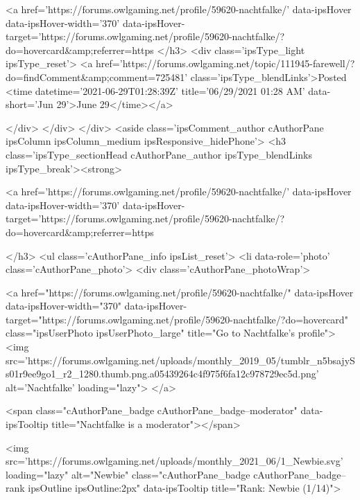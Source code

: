 <a href='https://forums.owlgaming.net/profile/59620-nachtfalke/' data-ipsHover data-ipsHover-width='370' data-ipsHover-target='https://forums.owlgaming.net/profile/59620-nachtfalke/?do=hovercard&amp;referrer=https%
			</h3>
			<div class='ipsType_light ipsType_reset'>
				<a href='https://forums.owlgaming.net/topic/111945-farewell/?do=findComment&amp;comment=725481' class='ipsType_blendLinks'>Posted <time datetime='2021-06-29T01:28:39Z' title='06/29/2021 01:28  AM' data-short='Jun 29'>June 29</time></a>
				
			</div>
		</div>
	</div>
	<aside class='ipsComment_author cAuthorPane ipsColumn ipsColumn_medium ipsResponsive_hidePhone'>
		<h3 class='ipsType_sectionHead cAuthorPane_author ipsType_blendLinks ipsType_break'><strong>


<a href='https://forums.owlgaming.net/profile/59620-nachtfalke/' data-ipsHover data-ipsHover-width='370' data-ipsHover-target='https://forums.owlgaming.net/profile/59620-nachtfalke/?do=hovercard&amp;referrer=https%
			
		</h3>
		<ul class='cAuthorPane_info ipsList_reset'>
			<li data-role='photo' class='cAuthorPane_photo'>
				<div class='cAuthorPane_photoWrap'>
					


	<a href="https://forums.owlgaming.net/profile/59620-nachtfalke/" data-ipsHover data-ipsHover-width="370" data-ipsHover-target="https://forums.owlgaming.net/profile/59620-nachtfalke/?do=hovercard" class="ipsUserPhoto ipsUserPhoto_large" title="Go to Nachtfalke's profile">
		<img src='https://forums.owlgaming.net/uploads/monthly_2019_05/tumblr_n5bsajySs01r9ee9go1_r2_1280.thumb.png.a05439264c4f975f6fa12c978729ec5d.png' alt='Nachtfalke' loading="lazy">
	</a>

					
						<span class="cAuthorPane_badge cAuthorPane_badge--moderator" data-ipsTooltip title="Nachtfalke is a moderator"></span>
					
					
						
<img src='https://forums.owlgaming.net/uploads/monthly_2021_06/1_Newbie.svg' loading="lazy" alt="Newbie" class="cAuthorPane_badge cAuthorPane_badge--rank ipsOutline ipsOutline:2px" data-ipsTooltip title="Rank: Newbie (1/14)">
					
